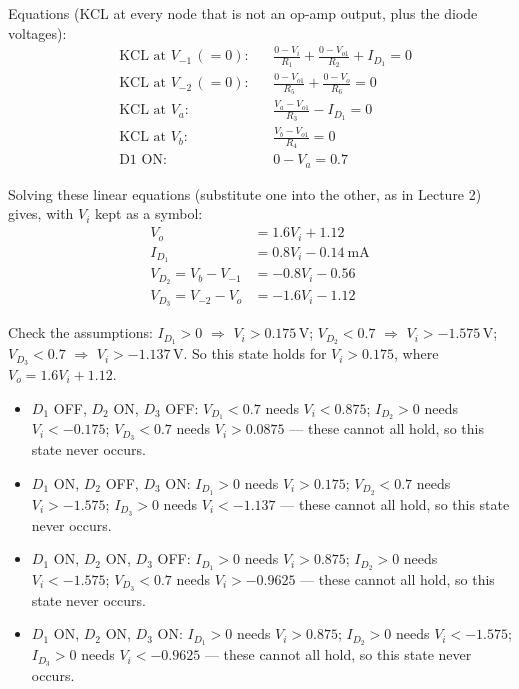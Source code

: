 \documentclass[11pt]{article}
\newcommand{\solstep}[2]{\par\medskip{\color{stepc}\textbf{Step #1 --- #2}}\par\nopagebreak}
\begin{document}
Equations (KCL at every node that is not an op-amp output, plus the diode voltages):\begin{align*}
&\text{KCL at }V_{-1}\,(=0): && \frac{0 - V_i}{R_{1}} + \frac{0 - V_{o1}}{R_{2}} + I_{D_{1}} = 0 \\
&\text{KCL at }V_{-2}\,(=0): && \frac{0 - V_{o1}}{R_{5}} + \frac{0 - V_{o}}{R_{6}} = 0 \\
&\text{KCL at }V_{a}: && \frac{V_{a} - V_{o1}}{R_{3}} - I_{D_{1}} = 0 \\
&\text{KCL at }V_{b}: && \frac{V_{b} - V_{o1}}{R_{4}} = 0 \\
&\text{D1 ON}: && 0 - V_{a} = 0.7
\end{align*}


Solving these linear equations (substitute one into the other, as in Lecture 2) gives, with $V_i$ kept as a symbol:\begin{align*}
V_{o} &= 1.6V_i + 1.12 \\
I_{D_{1}} &= 0.8V_i - 0.14\ \mathrm{mA} \\
V_{D_{2}} = V_{b} - V_{-1} &= -0.8V_i - 0.56 \\
V_{D_{3}} = V_{-2} - V_{o} &= -1.6V_i - 1.12
\end{align*}


Check the assumptions: $I_{D_{1}} > 0$ $\Rightarrow$ $V_i > 0.175$\,V; $V_{D_{2}} < 0.7$ $\Rightarrow$ $V_i > -1.575$\,V; $V_{D_{3}} < 0.7$ $\Rightarrow$ $V_i > -1.137$\,V. So this state holds for $\boxed{V_i > 0.175}$, where $V_o = 1.6V_i + 1.12$.
\solstep{6}{The other combinations}\begin{itemize}[leftmargin=*,itemsep=2pt]
\item $D_{1}$ OFF, $D_{2}$ ON, $D_{3}$ OFF: $V_{D_{1}}<0.7$ needs $V_i < 0.875$; $I_{D_{2}}>0$ needs $V_i < -0.175$; $V_{D_{3}}<0.7$ needs $V_i > 0.0875$ --- these cannot all hold, so this state never occurs.
\item $D_{1}$ ON, $D_{2}$ OFF, $D_{3}$ ON: $I_{D_{1}}>0$ needs $V_i > 0.175$; $V_{D_{2}}<0.7$ needs $V_i > -1.575$; $I_{D_{3}}>0$ needs $V_i < -1.137$ --- these cannot all hold, so this state never occurs.
\item $D_{1}$ ON, $D_{2}$ ON, $D_{3}$ OFF: $I_{D_{1}}>0$ needs $V_i > 0.875$; $I_{D_{2}}>0$ needs $V_i < -1.575$; $V_{D_{3}}<0.7$ needs $V_i > -0.9625$ --- these cannot all hold, so this state never occurs.
\item $D_{1}$ ON, $D_{2}$ ON, $D_{3}$ ON: $I_{D_{1}}>0$ needs $V_i > 0.875$; $I_{D_{2}}>0$ needs $V_i < -1.575$; $I_{D_{3}}>0$ needs $V_i < -0.9625$ --- these cannot all hold, so this state never occurs.
\end{itemize}
\end{document}
